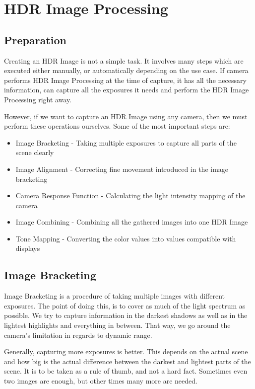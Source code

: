 \documentclass{article}
\begin{document}
\section{HDR Image Processing}
\subsection{Preparation}
Creating an HDR Image is not a simple task. It involves many steps which are executed either manually, or automatically depending on the use case. 
If camera performs HDR Image Processing at the time of capture, it has all the necessary information, 
can capture all the exposures it needs and perform the HDR Image Processing right away.

However, if we want to capture an HDR Image using any camera, then we must perform these operations ourselves.
Some of the most important steps are:
\begin{itemize}
    \item Image Bracketing - Taking multiple exposures to capture all parts of the scene clearly
    \item Image Alignment - Correcting fine movement introduced in the image bracketing
    \item Camera Response Function - Calculating the light intensity mapping of the camera
    \item Image Combining - Combining all the gathered images into one HDR Image
    \item Tone Mapping - Converting the color values into values compatible with displays
\end{itemize}

\subsection{Image Bracketing}
Image Bracketing is a procedure of taking multiple images with different exposures. 
The point of doing this, is to cover as much of the light spectrum as possible. We try to capture information in the darkest shadows
as well as in the lightest highlights and everything in between.
That way, we go around the camera's limitation in regards to dynamic range. 

Generally, capturing more exposures is better. This depends on the actual scene and how big is the actual difference between the darkest and lightest parts of the scene. It is to be taken as a rule of thumb, and not a hard fact.
Sometimes even two images are enough, but other times many more are needed. 
\end{document}
